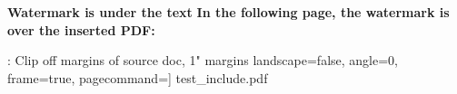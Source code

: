 \documentclass[]{article}
\begin{document}
\textbf{Watermark is under the text}
\lipsum[1-3]
\textbf{In the following page, the watermark is over the inserted PDF:}
\clearpage

: Clip off margins of source doc, 1" margins
	landscape=false, angle=0,   %
	frame=true,                 %
	pagecommand={}]             %
	{test_include.pdf}   %
\end{document}
